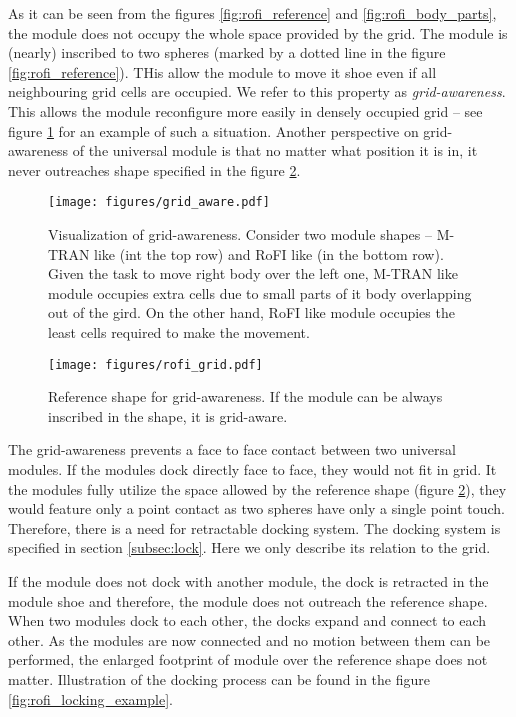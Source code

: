 As it can be seen from the figures \ref{fig:rofi_reference} and
\ref{fig:rofi_body_parts}, the module does not occupy the whole space provided
by the grid. The module is (nearly) inscribed to two spheres (marked by a dotted
line in the figure \ref{fig:rofi_reference}). THis allow the module to move it
shoe even if all neighbouring grid cells are occupied. We refer to this property
as \emph{grid-awareness}. This allows the module reconfigure more easily in
densely occupied grid -- see figure \ref{fig:grid_aware} for an example of such
a situation. Another perspective on grid-awareness of the universal module is
that no matter what position it is in, it never outreaches shape specified in
the figure \ref{fig:rofi_grid}.

\begin{figure}
    \centering
    \texttt{[image: figures/grid\_aware.pdf]}
    \caption{Visualization of grid-awareness. Consider two module shapes -- M-TRAN\cite{haruhisa_kurokawa_m-tran_2003}
     like (int the top row) and RoFI like (in the bottom row). Given the task to
     move right body over the left one, M-TRAN like module occupies extra cells
     due to small parts of it body overlapping out of the gird. On the other
     hand, RoFI like module occupies the least cells required to make the
     movement.   }
    \label{fig:grid_aware}
\end{figure}

\begin{figure}
    \centering
    \texttt{[image: figures/rofi\_grid.pdf]}
    \caption{Reference shape for grid-awareness. If the module can be always inscribed in the shape, it is grid-aware.}
    \label{fig:rofi_grid}
\end{figure}

The grid-awareness prevents a face to face contact between two universal
modules. If the modules dock directly face to face, they would not fit in grid.
It the modules fully utilize the space allowed by the reference shape (figure
\ref{fig:rofi_grid}), they would feature only a point contact as two spheres
have only a single point touch. Therefore, there is a need for retractable
docking system. The docking system is specified in section \ref{subsec:lock}.
Here we only describe its relation to the grid.

If the module does not dock with another module, the dock is retracted in the
module shoe and therefore, the module does not outreach the reference shape.
When two modules dock to each other, the docks expand and connect to each other.
As the modules are now connected and no motion between them can be performed,
the enlarged footprint of module over the reference shape does not matter.
Illustration of the docking process can be found in the figure
\ref{fig:rofi_locking_example}.

